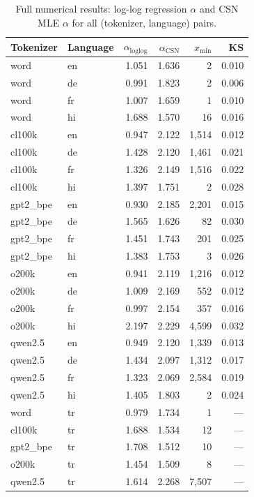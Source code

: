 \documentclass{article}
\begin{document}
\begin{table}[h]
  \caption{Full numerical results: log-log regression $\alpha$ and CSN MLE $\alpha$
    for all (tokenizer, language) pairs.}
  \label{tab:csn}
  \centering
  \small
  \begin{tabular}{llrrrr}
    \toprule
    Tokenizer & Language & $\alpha_{\text{loglog}}$ & $\alpha_{\text{CSN}}$ & $x_{\min}$ & KS \\
    \midrule
    word     & en & 1.051 & 1.636 &     2 & 0.010 \\
    word     & de & 0.991 & 1.823 &     2 & 0.006 \\
    word     & fr & 1.007 & 1.659 &     1 & 0.010 \\
    word     & hi & 1.688 & 1.570 &    16 & 0.016 \\
    cl100k   & en & 0.947 & 2.122 & 1,514 & 0.012 \\
    cl100k   & de & 1.428 & 2.120 & 1,461 & 0.021 \\
    cl100k   & fr & 1.326 & 2.149 & 1,516 & 0.022 \\
    cl100k   & hi & 1.397 & 1.751 &     2 & 0.028 \\
    gpt2\_bpe & en & 0.930 & 2.185 & 2,201 & 0.015 \\
    gpt2\_bpe & de & 1.565 & 1.626 &    82 & 0.030 \\
    gpt2\_bpe & fr & 1.451 & 1.743 &   201 & 0.025 \\
    gpt2\_bpe & hi & 1.383 & 1.753 &     3 & 0.026 \\
    o200k    & en & 0.941 & 2.119 & 1,216 & 0.012 \\
    o200k    & de & 1.009 & 2.169 &   552 & 0.012 \\
    o200k    & fr & 0.997 & 2.154 &   357 & 0.016 \\
    o200k    & hi & 2.197 & 2.229 & 4,599 & 0.032 \\
    qwen2.5  & en & 0.949 & 2.120 & 1,339 & 0.013 \\
    qwen2.5  & de & 1.434 & 2.097 & 1,312 & 0.017 \\
    qwen2.5  & fr & 1.323 & 2.069 & 2,584 & 0.019 \\
    qwen2.5  & hi & 1.405 & 1.803 &     2 & 0.024 \\
    \midrule
    word     & tr & 0.979 & 1.734 &     1 & --- \\
    cl100k   & tr & 1.688 & 1.534 &    12 & --- \\
    gpt2\_bpe & tr & 1.708 & 1.512 &    10 & --- \\
    o200k    & tr & 1.454 & 1.509 &     8 & --- \\
    qwen2.5  & tr & 1.614 & 2.268 & 7,507 & --- \\
    \bottomrule
  \end{tabular}
\end{table}
\end{document}

